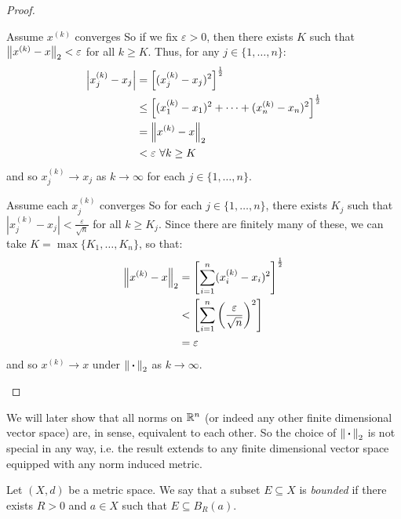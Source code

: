 \documentclass[../main.tex]{subfiles}
\begin{document}
\begin{proof}
\begin{proofdirection}{Assume $x^{(k)}$ converges}
  So if we fix $\varepsilon > 0$, then there exists $K$ such that $\left\lVert x^{(k)} - x \right\rVert_2 < \varepsilon$ for all $k \geq K$.
  Thus, for any $j \in \{1, \ldots, n\}$:
  \begin{align*}
    \left\lvert x^{(k)}_j - x_j \right\rvert &= \left[(x^{(k)}_j - x_j)^2\right]^{\frac{1}{2}} \\
                          &\leq \left[(x^{(k)}_1 - x_1)^2 + \cdots + (x^{(k)}_n - x_n)^2\right]^{\frac{1}{2}} \\
                          &= \left\lVert x^{(k)} - x \right\rVert_{2} \\
                          &< \varepsilon\ \forall k \geq K
  \end{align*}
  and so $x^{(k)}_j \to x_j$ as $k \to \infty$ for each $j \in \{1, \ldots, n\}$.
\end{proofdirection}
\begin{proofdirection}{Assume each $x^{(k)}_j$ converges}
  So for each $j \in \{1, \ldots, n\}$, there exists $K_j$ such that $|x^{(k)}_j - x_j| < \frac{\varepsilon}{\sqrt{n}}$ for all $k \geq K_j$.
  Since there are finitely many of these, we can take $K = \max\{K_1, \ldots, K_n\}$, so that:
  \begin{align*}
    \left\lVert x^{(k)} - x \right\rVert_2 &= \left[\sum_{i = 1}^{n} (x^{(k)}_i - x_i)^2\right]^{\frac{1}{2}} \\
                         &< \left[\sum_{i = 1}^{n} \left(\frac{\varepsilon}{\sqrt{n}}\right)^2\right] \\
                         &= \varepsilon
  \end{align*}
  and so $x^{(k)} \to x$ under $\left\lVert {\hspace{0.18em}\boldsymbol{\cdot}\hspace{0.18em}} \right\rVert_2$ as $k \to \infty$.
\end{proofdirection}
\end{proof}
\begin{remark}
  We will later show that all norms on $\mathbb{R}^{n}$ (or indeed any other finite dimensional vector space) are, in  sense, equivalent to each other.
  So the choice of $\left\lVert {\hspace{0.18em}\boldsymbol{\cdot}\hspace{0.18em}} \right\rVert_2$ is not special in any way, i.e. the result extends to any finite dimensional vector space equipped with any norm induced metric.
\end{remark}
\begin{definition}
  Let $(X, d)$ be a metric space.
  We say that a subset $E \subseteq X$ is \textit{bounded} if there exists $R > 0$ and $a \in X$ such that $E \subseteq B_R(a)$.
\end{definition}
\end{document}
